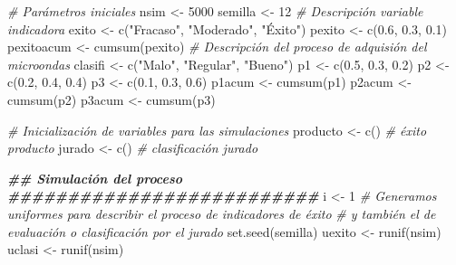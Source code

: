 \documentclass[
]{book}
\newenvironment{Shaded}{\begin{snugshade}}{\end{snugshade}}
\newcommand{\CommentTok}[1]{\textcolor[rgb]{0.56,0.35,0.01}{\textit{#1}}}
\newcommand{\DecValTok}[1]{\textcolor[rgb]{0.00,0.00,0.81}{#1}}
\newcommand{\DocumentationTok}[1]{\textcolor[rgb]{0.56,0.35,0.01}{\textbf{\textit{#1}}}}
\newcommand{\FloatTok}[1]{\textcolor[rgb]{0.00,0.00,0.81}{#1}}
\newcommand{\FunctionTok}[1]{\textcolor[rgb]{0.00,0.00,0.00}{#1}}
\newcommand{\NormalTok}[1]{#1}
\newcommand{\OtherTok}[1]{\textcolor[rgb]{0.56,0.35,0.01}{#1}}
\newcommand{\StringTok}[1]{\textcolor[rgb]{0.31,0.60,0.02}{#1}}
\theoremstyle{definition}
\theoremstyle{definition}
\theoremstyle{definition}
\theoremstyle{definition}
\theoremstyle{remark}
\begin{document}
\begin{Shaded}
\begin{Highlighting}[]
\CommentTok{\# Parámetros iniciales}
\NormalTok{nsim }\OtherTok{\textless{}{-}} \DecValTok{5000}
\NormalTok{semilla }\OtherTok{\textless{}{-}} \DecValTok{12}
\CommentTok{\# Descripción variable indicadora}
\NormalTok{exito }\OtherTok{\textless{}{-}} \FunctionTok{c}\NormalTok{(}\StringTok{"Fracaso"}\NormalTok{, }\StringTok{"Moderado"}\NormalTok{, }\StringTok{"Éxito"}\NormalTok{)}
\NormalTok{pexito }\OtherTok{\textless{}{-}} \FunctionTok{c}\NormalTok{(}\FloatTok{0.6}\NormalTok{, }\FloatTok{0.3}\NormalTok{, }\FloatTok{0.1}\NormalTok{)}
\NormalTok{pexitoacum }\OtherTok{\textless{}{-}} \FunctionTok{cumsum}\NormalTok{(pexito)}
\CommentTok{\# Descripción del proceso de adquisión del microondas}
\NormalTok{clasifi }\OtherTok{\textless{}{-}} \FunctionTok{c}\NormalTok{(}\StringTok{"Malo"}\NormalTok{, }\StringTok{"Regular"}\NormalTok{, }\StringTok{"Bueno"}\NormalTok{)}
\NormalTok{p1 }\OtherTok{\textless{}{-}} \FunctionTok{c}\NormalTok{(}\FloatTok{0.5}\NormalTok{, }\FloatTok{0.3}\NormalTok{, }\FloatTok{0.2}\NormalTok{)}
\NormalTok{p2 }\OtherTok{\textless{}{-}} \FunctionTok{c}\NormalTok{(}\FloatTok{0.2}\NormalTok{, }\FloatTok{0.4}\NormalTok{, }\FloatTok{0.4}\NormalTok{)}
\NormalTok{p3 }\OtherTok{\textless{}{-}} \FunctionTok{c}\NormalTok{(}\FloatTok{0.1}\NormalTok{, }\FloatTok{0.3}\NormalTok{, }\FloatTok{0.6}\NormalTok{)}
\NormalTok{p1acum }\OtherTok{\textless{}{-}} \FunctionTok{cumsum}\NormalTok{(p1)}
\NormalTok{p2acum }\OtherTok{\textless{}{-}} \FunctionTok{cumsum}\NormalTok{(p2)}
\NormalTok{p3acum }\OtherTok{\textless{}{-}} \FunctionTok{cumsum}\NormalTok{(p3)}

\CommentTok{\# Inicialización de variables para las simulaciones}
\NormalTok{producto }\OtherTok{\textless{}{-}} \FunctionTok{c}\NormalTok{()             }\CommentTok{\# éxito producto}
\NormalTok{jurado }\OtherTok{\textless{}{-}} \FunctionTok{c}\NormalTok{()               }\CommentTok{\# clasificación jurado}

\DocumentationTok{\#\# Simulación del proceso}
\DocumentationTok{\#\#\#\#\#\#\#\#\#\#\#\#\#\#\#\#\#\#\#\#\#\#\#\#\#\#}
\NormalTok{i }\OtherTok{\textless{}{-}} \DecValTok{1}
\CommentTok{\# Generamos uniformes para describir el proceso de indicadores de éxito}
\CommentTok{\# y también el de evaluación o clasificación por el jurado}
\FunctionTok{set.seed}\NormalTok{(semilla)}
\NormalTok{uexito }\OtherTok{\textless{}{-}} \FunctionTok{runif}\NormalTok{(nsim)  }
\NormalTok{uclasi }\OtherTok{\textless{}{-}} \FunctionTok{runif}\NormalTok{(nsim)}


\end{Highlighting}
\end{Shaded}
\end{document}
